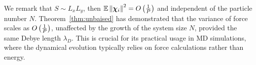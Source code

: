 We remark that $S \sim L_xL_y$, then $	\mathbb{E}\left\lVert\boldsymbol{\chi}_{i}\right\rVert^2=O\left(\frac{1}{P}\right)$ and independent of the particle number $N$.
Theorem~\ref{thm:unbaised} has demonstrated that the variance of force scales as $O\left(\frac{1}{P}\right)$, unaffected by the growth of the system size $N$, provided the same   Debye length $\lambda_{D}$. 
This is crucial for its practical usage in MD simulations, where the dynamical evolution typically relies on force calculations rather than energy. 



